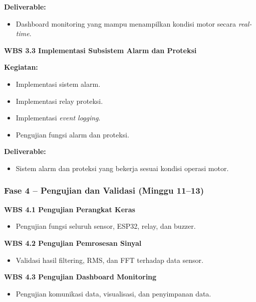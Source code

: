 \documentclass{elsinta}
\begin{document}
\textbf{Deliverable:}
\begin{itemize}
    \item Dashboard monitoring yang mampu menampilkan kondisi motor secara \textit{real-time}.
\end{itemize}

\textbf{WBS 3.3 Implementasi Subsistem Alarm dan Proteksi}

\textbf{Kegiatan:}
\begin{itemize}
    \item Implementasi sistem alarm.
    \item Implementasi relay proteksi.
    \item Implementasi \textit{event logging}.
    \item Pengujian fungsi alarm dan proteksi.
\end{itemize}

\textbf{Deliverable:}
\begin{itemize}
    \item Sistem alarm dan proteksi yang bekerja sesuai kondisi operasi motor.
\end{itemize}

\subsubsection*{Fase 4 -- Pengujian dan Validasi (Minggu 11--13)}

\textbf{WBS 4.1 Pengujian Perangkat Keras}

\begin{itemize}
    \item Pengujian fungsi seluruh sensor, ESP32, relay, dan buzzer.
\end{itemize}

\textbf{WBS 4.2 Pengujian Pemrosesan Sinyal}

\begin{itemize}
    \item Validasi hasil filtering, RMS, dan FFT terhadap data sensor.
\end{itemize}

\textbf{WBS 4.3 Pengujian Dashboard Monitoring}

\begin{itemize}
    \item Pengujian komunikasi data, visualisasi, dan penyimpanan data.
\end{itemize}
\end{document}
